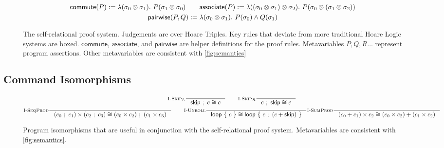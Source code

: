 \documentclass[p.tex]{subfiles}
\begin{document}
\begin{figure}
\begin{spreadlines}{5pt}
\begin{subequations}
\begin{gather*}
  \\
  \commute(P) := \lambda(\sigma_0 \otimes \sigma_1).~P(\sigma_1 \otimes \sigma_0)
  \qquad
  \associate(P) :=%
  \lambda((\sigma_0 \otimes \sigma_1) \otimes \sigma_2).~P(\sigma_0
  \otimes (\sigma_1 \otimes \sigma_2))\\
  \pairwise(P, Q) := \lambda(\sprod{\sigma_0}{\sigma_1}).~P(\sigma_0) \land Q(\sigma_1)
\end{gather*}
\end{subequations}
\end{spreadlines}
\caption{The self-relational proof system. Judgements are over
Hoare Triples. Key rules that deviate from more traditional Hoare
Logic systems are boxed.
$\textsf{commute}$, $\textsf{associate}$, and
$\textsf{pairwise}$ are helper definitions for the proof rules.
Metavariables $P, Q, R\ldots$ represent program
assertions. Other metavariables are consistent with
\cref{fig:semantics}}\label{fig:proof-system}
\end{figure}

\subsection{Command Isomorphisms}

\begin{figure}
\begin{spreadlines}{5pt}
\begin{gather*}
  \inference[$\textsc{I-Skip}_L$]{%
  }{%
    \cseq{\cskip}{c} \cong c
  }
  \qquad
  \inference[$\textsc{I-Skip}_R$]{%
  }{%
    \cseq{c}{\cskip} \cong c
  }
  \\
  \inference[\textsc{I-SeqProd}]{%
  }{%
    \cprod{(\cseq{c_0}{c_1})}{(\cseq{c_2}{c_3})} \cong
    \cseq{(\cprod{c_0}{c_2})}{(\cprod{c_1}{c_3})}
  }
  \qquad
  \inference[\textsc{I-Unroll}]{%
  }{%
    \cloop{c} \cong \cloop{\cseq{c}{(\csum{c}{\cskip})}}
  }
  \inference[\textsc{I-SumProd}]{%
  }{%
    \cprod{(\csum{c_0}{c_1})}{c_2} \cong
    \csum{(\cprod{c_0}{c_2})}{(\cprod{c_1}{c_2})}
  }
\end{gather*}
\end{spreadlines}
\caption{%
  Program isomorphisms that are useful in conjunction with the
  self-relational proof system. Metavariables are consistent with
  \cref{fig:semantics}.
}
\end{figure}
\end{document}
